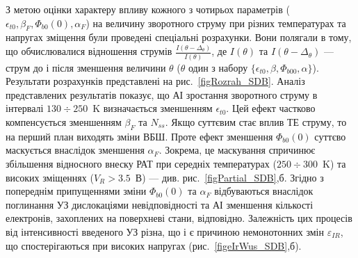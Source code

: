 З метою оцінки характеру впливу  кожного з чотирьох параметрів ($\epsilon_{t0}, \beta_F, \Phi_{b0}(0), \alpha_F$) на величину зворотного струму при
різних температурах та напругах зміщення були проведені спеціальні розрахунки.
Вони полягали в тому, що обчислювалися відношення струмів
$\frac{I(\theta-\Delta_\theta)}{I(\theta)}$,
де $I(\theta)$ та $I(\theta-\Delta_\theta)$ --- струм до і після зменшення величини $\theta$ ($\theta$ один з набору $\{\epsilon_{t0}, \beta, \Phi_{b00}, \alpha\}$).
Результати розрахунків представлені на рис.~\ref{figRozrah_SDB}.
Аналіз представлених результатів показує, що АІ зростання зворотного струму в інтервалі $130\div250$~K визначається зменшенням $\epsilon_{t0}$.
Цей ефект частково компенсується зменшенням $\beta_F$ та $N_{ss}$.
Якщо суттєвим стає вплив ТЕ струму, то на перший план виходять зміни ВБШ.
Проте ефект зменшення $\Phi_{b0}(0)$ суттєво маскується внаслідок зменшення $\alpha_F$.
Зокрема, це маскування спричинює збільшення відносного внеску РАТ при середніх температурах ($250\div300$~K) та високих зміщеннях ($V_R>3.5$~В) --- див. рис.~\ref{figPartial_SDB},б.
Згідно з попереднім  припущеннями зміни $\Phi_{b0}(0)$ та $\alpha_F$ відбуваються внаслідок поглинання УЗ дислокаціями
невідповідності та АІ зменшення кількості електронів, захоплених на поверхневі стани, відповідно.
Залежність цих процесів від інтенсивності введеного УЗ різна,
що і є причиною немонотонних змін $\varepsilon_{IR}$, що спостерігаються при високих напругах (рис.~\ref{figeIrWus_SDB},б).



